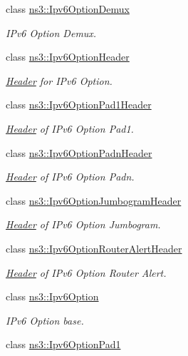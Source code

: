 \begin{DoxyCompactItemize}
class \hyperlink{classns3_1_1Ipv6OptionDemux}{ns3\+::\+Ipv6\+Option\+Demux}
\begin{DoxyCompactList}\small\item\em I\+Pv6 Option Demux. \end{DoxyCompactList}\item 
class \hyperlink{classns3_1_1Ipv6OptionHeader}{ns3\+::\+Ipv6\+Option\+Header}
\begin{DoxyCompactList}\small\item\em \hyperlink{classns3_1_1Header}{Header} for I\+Pv6 Option. \end{DoxyCompactList}\item 
class \hyperlink{classns3_1_1Ipv6OptionPad1Header}{ns3\+::\+Ipv6\+Option\+Pad1\+Header}
\begin{DoxyCompactList}\small\item\em \hyperlink{classns3_1_1Header}{Header} of I\+Pv6 Option Pad1. \end{DoxyCompactList}\item 
class \hyperlink{classns3_1_1Ipv6OptionPadnHeader}{ns3\+::\+Ipv6\+Option\+Padn\+Header}
\begin{DoxyCompactList}\small\item\em \hyperlink{classns3_1_1Header}{Header} of I\+Pv6 Option Padn. \end{DoxyCompactList}\item 
class \hyperlink{classns3_1_1Ipv6OptionJumbogramHeader}{ns3\+::\+Ipv6\+Option\+Jumbogram\+Header}
\begin{DoxyCompactList}\small\item\em \hyperlink{classns3_1_1Header}{Header} of I\+Pv6 Option Jumbogram. \end{DoxyCompactList}\item 
class \hyperlink{classns3_1_1Ipv6OptionRouterAlertHeader}{ns3\+::\+Ipv6\+Option\+Router\+Alert\+Header}
\begin{DoxyCompactList}\small\item\em \hyperlink{classns3_1_1Header}{Header} of I\+Pv6 Option Router Alert. \end{DoxyCompactList}\item 
class \hyperlink{classns3_1_1Ipv6Option}{ns3\+::\+Ipv6\+Option}
\begin{DoxyCompactList}\small\item\em I\+Pv6 Option base. \end{DoxyCompactList}\item 
class \hyperlink{classns3_1_1Ipv6OptionPad1}{ns3\+::\+Ipv6\+Option\+Pad1}

\end{DoxyCompactItemize}
